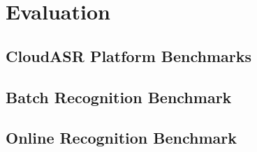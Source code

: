 \chapter{Evaluation}
\blindtext

\section{CloudASR Platform Benchmarks}
\blindtext
\blindtext


\section{Batch Recognition Benchmark}
\blindtext
\blindtext

\section{Online Recognition Benchmark}
\blindtext
\blindtext
